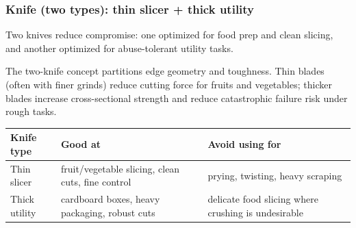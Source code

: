\begin{frame}[t]
  \frametitle{Knife (two types): thin slicer + thick utility}
  \justifying
   Two knives reduce compromise: one optimized for food prep and clean slicing, and another optimized for abuse-tolerant utility tasks.

  \vspace{0.5em}
   The two-knife concept partitions edge geometry and toughness. Thin blades (often with finer grinds) reduce cutting force for fruits and vegetables; thicker blades increase cross-sectional strength and reduce catastrophic failure risk under rough tasks.

  \vspace{0.8em}
  \TableBodySize
  \begin{table}
    \centering
    \begin{tabularx}{\textwidth}{@{}lX X@{}}
      \toprule
      \textbf{Knife type} & \textbf{Good at} & \textbf{Avoid using for} \\
      \midrule
      Thin slicer & fruit/vegetable slicing, clean cuts, fine control & prying, twisting, heavy scraping \\
      Thick utility & cardboard boxes, heavy packaging, robust cuts & delicate food slicing where crushing is undesirable \\
      \bottomrule
    \end{tabularx}
  \end{table}

\end{frame}

